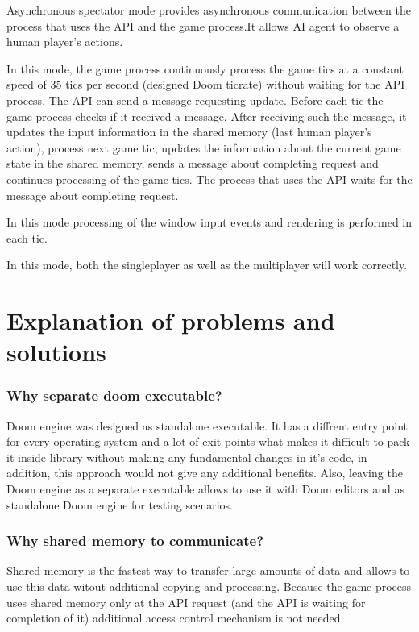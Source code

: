 	    Asynchronous spectator mode provides asynchronous communication between the process that uses the API and the game process.It allows AI agent to observe a human player's actions. 
	    
	    In this mode, the game process continuously process the game tics at a constant speed of 35 tics per second (designed Doom ticrate) without waiting for the API process. The API can send a message requesting update. Before each tic the game process checks if it received a message. After receiving such the message, it updates the input information in the shared memory (last human player's action), process next game tic, updates the information about the current game state in the shared memory, sends a message about completing request and continues processing of the game tics. The process that uses the API waits for the message about completing request.

        In this mode processing of the window input events and rendering is performed in each tic.
        
        In this mode, both the singleplayer as well as the multiplayer will work correctly.

\section{Explanation of problems and solutions}\label{sec:architecture_solutions}

\subsubsection{Why separate doom executable?}

Doom engine was designed as standalone executable. It has a diffrent entry point for every operating system and a lot of exit points what makes it difficult to pack it inside library without making any fundamental changes in it's code, in addition, this approach would not give any additional benefits. Also, leaving the Doom engine as a separate executable allows to use it with Doom editors and as standalone Doom engine for testing scenarios.

\subsubsection{Why shared memory to communicate?}

Shared memory is the fastest way to transfer large amounts of data and allows to use this data witout additional copying and processing. 
Because the game process uses shared memory only at the API request (and the API is waiting for completion of it) additional access control mechanism is not needed.

